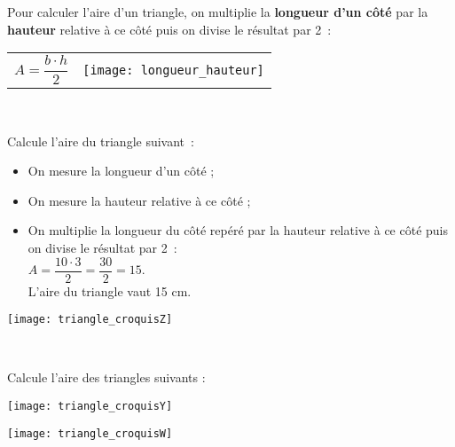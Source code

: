 
\begin{methode*1}

\begin{aconnaitre}
Pour calculer l’aire d’un triangle, on multiplie la \textbf{\textcolor{H1}{longueur d'un côté}} par la \textbf{\textcolor{C2}{hauteur}} relative à ce côté puis on divise le résultat par 2 :

\begin{tabularx}{\textwidth}{XX}
$A = \dfrac{b \cdot h}{2}$ & \texttt{[image: longueur\_hauteur]} \\
 \end{tabularx} \\
 \end{aconnaitre}
 
\begin{exemple*1}
Calcule l’aire du triangle suivant :
\begin{minipage}[c]{0.68\textwidth}
\begin{itemize}
 \item On mesure la longueur d'un côté ;
 \item On mesure la hauteur relative à ce côté ;
 \item On multiplie la longueur du côté repéré par la hauteur relative à ce côté puis on divise le résultat par 2 : \\[0.3em]
$A = \dfrac{10 \cdot 3}{2} = \dfrac{30}{2} = 15$. \\[0.3em]
L'aire du triangle vaut 15 cm.
 \end{itemize}
 \end{minipage} \hfill%
 \begin{minipage}[c]{0.2\textwidth}
 \texttt{[image: triangle\_croquisZ]}
 \end{minipage} \\
\end{exemple*1}


\exercice 
Calcule l’aire des triangles suivants :
\begin{colenumerate}{2}
 \item
 
 \texttt{[image: triangle\_croquisY]}
 \item
 
 \texttt{[image: triangle\_croquisW]}
 \end{colenumerate}

\end{methode*1}

